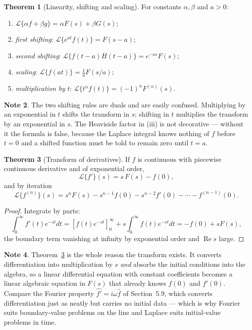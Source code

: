 \documentclass[12pt,a4paper]{report}
\theoremstyle{definition}
\newtheorem{thm}{Theorem}[section]
\newtheorem{note}[thm]{Note}
\theoremstyle{plain}
\begin{document}
\begin{thm}[Linearity, shifting and scaling]
For constants $\alpha,\beta$ and $a>0$:
\begin{enumerate}
\item[(i)] $\mathcal{L}\{\alpha f+\beta g\} = \alpha F(s)+\beta G(s)$;
\item[(ii)] \emph{first shifting}: $\mathcal{L}\{e^{at}f(t)\} = F(s-a)$;
\item[(iii)] \emph{second shifting}:
$\mathcal{L}\{f(t-a)H(t-a)\} = e^{-as}F(s)$;
\item[(iv)] \emph{scaling}: $\mathcal{L}\{f(at)\} = \frac{1}{a}F(s/a)$;
\item[(v)] \emph{multiplication by $t$}:
$\mathcal{L}\{t^{n}f(t)\} = (-1)^{n}F^{(n)}(s)$.
\end{enumerate}
\end{thm}

\begin{note}
The two shifting rules are duals and are easily confused. Multiplying by an
exponential in $t$ shifts the transform in $s$; shifting in $t$ multiplies the
transform by an exponential in $s$. The Heaviside factor in (iii) is not
decorative --- without it the formula is false, because the Laplace integral
knows nothing of $f$ before $t=0$ and a shifted function must be told to remain
zero until $t=a$.
\end{note}

\begin{thm}[Transform of derivatives]
\label{thm:laplacederiv}
If $f$ is continuous with piecewise continuous derivative and of exponential
order,
$$\mathcal{L}\{f'\}(s) = s\,F(s) - f(0),$$
and by iteration
$$\mathcal{L}\{f^{(n)}\}(s)
= s^{n}F(s) - s^{n-1}f(0) - s^{n-2}f'(0) - \cdots - f^{(n-1)}(0).$$
\end{thm}

\begin{proof}
Integrate by parts:
$$\int^{\infty}_{0}f'(t)e^{-st}dt
= \left[f(t)e^{-st}\right]^{\infty}_{0} + s\int^{\infty}_{0}f(t)e^{-st}dt
= -f(0) + sF(s),$$
the boundary term vanishing at infinity by exponential order and
$\operatorname{Re}s$ large.
\end{proof}

\begin{note}
Theorem~\ref{thm:laplacederiv} is the whole reason the transform exists. It
converts differentiation into multiplication by $s$ \emph{and} absorbs the
initial conditions into the algebra, so a linear differential equation with
constant coefficients becomes a linear algebraic equation in $F(s)$ that already
knows $f(0)$ and $f'(0)$. Compare the Fourier property
$\widehat{f'}=i\omega\widehat{f}$ of Section~5.9, which converts differentiation
just as neatly but carries no initial data --- which is why Fourier suits
boundary-value problems on the line and Laplace suits initial-value problems in
time.
\end{note}
\end{document}
